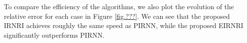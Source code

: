\documentclass[twoside,11pt]{article}
\numberwithin{equation}{section}
\begin{document}



To compare the efficiency of the algorithms,  we also plot the evolution of the relative error for each case in Figure \ref{fig.???}.  
We can see that the proposed IRNRI achieves roughly the same speed as PIRNN, while the proposed  EIRNRI 
significantly outperforms PIRNN.  
 
 
 
 
 
 
\end{document}
